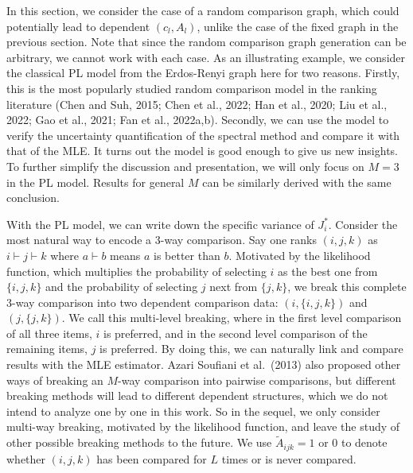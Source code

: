 In this section, we consider the case of a random comparison graph, which could potentially lead to dependent \((c_l,A_l)\), unlike the case of the fixed graph in the previous section. Note that since the random comparison graph generation can be arbitrary, we cannot work with each case. As an illustrating example, we consider the classical PL model from the Erdos-Renyi graph here for two reasons. Firstly, this is the most popularly studied random comparison model in the ranking literature (Chen and Suh, 2015; Chen et al., 2022; Han et al., 2020; Liu et al., 2022; Gao et al., 2021; Fan et al., 2022a,b). Secondly, we can use the model to verify the uncertainty quantification of the spectral method and compare it with that of the MLE. It turns out the model is good enough to give us new insights. To further simplify the discussion and presentation, we will only focus on \(M = 3\) in the PL model. Results for general \(M\) can be similarly derived with the same conclusion.

With the PL model, we can write down the specific variance of \(J_{i}^{*}\). Consider the most natural way to encode a 3-way comparison. Say one ranks \((i,j,k)\) as \(i\vdash j\vdash k\) where \(a\vdash b\) means \(a\) is better than \(b\). Motivated by the likelihood function, which multiplies the probability of selecting \(i\) as the best one from \(\{i,j,k\}\) and the probability of selecting \(j\) next from \(\{j,k\}\), we break this complete 3-way comparison into two dependent comparison data: \((i,\{i,j,k\})\) and \((j,\{j,k\})\). We call this multi-level breaking, where in the first level comparison of all three items, \(i\) is preferred, and in the second level comparison of the remaining items, \(j\) is preferred. By doing this, we can naturally link and compare results with the MLE estimator. Azari Soufiani et al.~(2013) also proposed other ways of breaking an \(M\)-way comparison into pairwise comparisons, but different breaking methods will lead to different dependent structures, which we do not intend to analyze one by one in this work. So in the sequel, we only consider multi-way breaking, motivated by the likelihood function, and leave the study of other possible breaking methods to the future. We use \(\widetilde{A}_{ijk} = 1\) or \(0\) to denote whether \((i,j,k)\) has been compared for \(L\) times or is never compared.

